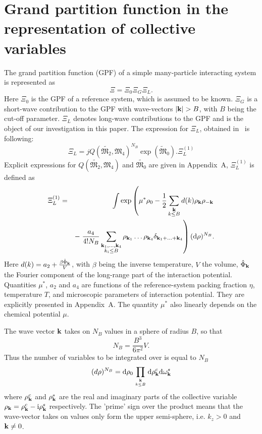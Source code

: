 \section{\label{sec:init-gpf} Grand partition function in the representation of collective variables}
The grand partition function (GPF) of a simple many-particle interacting system is represented as
\begin{equation}
	\label{Xi_as_prod}
	\Xi = \Xi_0\Xi_G\Xi_L.
\end{equation}
Here $\Xi_0$ is the GPF of a reference system, which is assumed to be known. $\Xi_G$ is a short-wave contribution to the GPF with wave-vectors $\abs{\vb{k}}>B$, with $B$ being the cut-off parameter.
$\Xi_L$ denotes long-wave contributions to the GPF and is the object of our investigation in this paper. The expression for $\Xi_L$, obtained in~\cite{Roma2023Preprint} is following:
\begin{equation}
	\label{Xi_L}
	\Xi_L = jQ(\tilde{\mathfrak{M}_2}, \mathfrak{M}_4)^{N_B} \exp(\tilde{\mathfrak{M}}_0). \Xi_L^{(1)}
\end{equation} 
Explicit expressions for $Q(\tilde{\mathfrak{M}_2}, \mathfrak{M}_4)$ and $\tilde{\mathfrak{M}_0}$ are given in Appendix~A, $\Xi_L^{(1)}$ is defined as
\begin{eqnarray}
	\label{Xi_L_1}
	\Xi_L^{(1)} &=& 
	\int \exp\left(
	\mu^* \rho_0 - \frac{1}{2} \sum_{\substack{\vb k \\ k \leq B}} d(k) \rho_{\vb k} \rho_{-\vb k} 
	\right.\\
	&& -\left. \frac{a_4}{4! N_B} \sum_{\substack{\vb k_1, \dotsc, \vb k_4 \\ k_i \leq B}} \rho_{\vb k_1} \dotsc \rho_{\vb k_4} \delta_{\vb{k}_1 + \dotsc + \vb{k}_4} \right) ({\rm d} \rho)^{N_B}
	\nonumber.
\end{eqnarray}
Here $d(k) = a_2 + \frac{\beta\hat{\Phi}_{\vb k}}{V}$, with $\beta$ being the inverse temperature, $V$ the volume, $\hat{\Phi}_{\vb k}$ the Fourier component of the long-range part of the interaction potential.
Quantities $\mu^*$, $a_2$ and $a_4$ are functions of the reference-system packing fraction $\eta$, temperature $T$, and microscopic parameters of interaction potential. They are explicitly presented in Appendix~A. The quantity $\mu^*$ also linearly depends on the chemical potential $\mu$.

The wave vector $\vb k$ takes on $N_B$ values in a sphere of radius $B$, so that
\begin{equation}
	\label{NB}
	N_B = \frac{B^3}{6\pi^2}V.
\end{equation}
Thus the number of variables to be integrated over is equal to $N_B$
\begin{equation*}
	(d\rho)^{N_B} = {\rm d}\rho_0 \prod_{\vb k\atop k\le B} {\rm d}\rho_{\vb k}^c {\rm d}\omega_{\vb k}^s
\end{equation*}
where $\rho_{\vb k}^c$ and $\rho_{\vb k}^s$ are the real and imaginary parts of the collective variable $\rho_{\vb k} = \rho_{\vb k}^c - {\rm i} \rho_{\vb k}^s$ respectively. The 'prime' sign over the product means that the wave-vector takes on values only form the upper semi-sphere, i.e. $k_z > 0$ and $\vb k \neq 0$.


